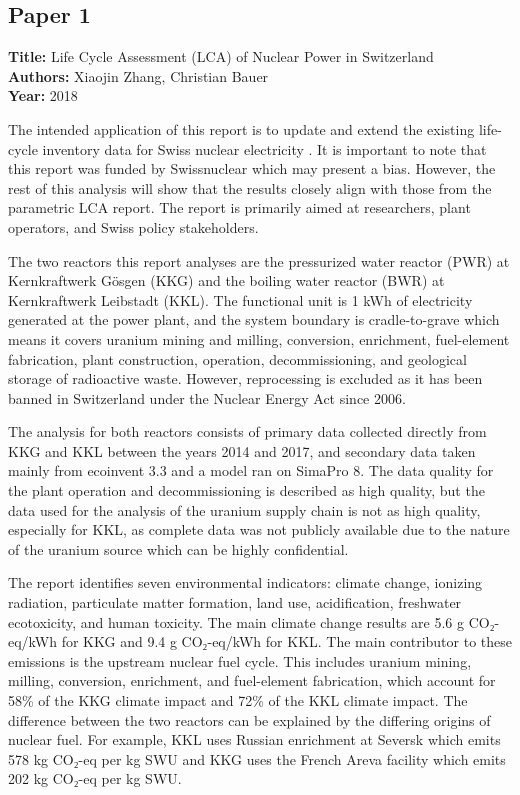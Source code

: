 \documentclass[9pt]{extarticle}
\begin{document}
\subsection{Paper 1 \parencite{zhang}}
\textbf{Title:} Life Cycle Assessment (LCA) of Nuclear Power in Switzerland\\
\textbf{Authors:} Xiaojin Zhang, Christian Bauer\\
\textbf{Year:} 2018

The intended application of this report is to update and extend the existing life-cycle
inventory data for Swiss nuclear electricity \parencite{zhang}. It is important to note
that this report was funded by Swissnuclear which may present a bias. However, the rest
of this analysis will show that the results closely align with those from the parametric
LCA report. The report is primarily aimed at researchers, plant operators, and Swiss
policy stakeholders.

The two reactors this report analyses are the pressurized water reactor (PWR) at
Kernkraftwerk Gösgen (KKG) and the boiling water reactor (BWR) at Kernkraftwerk
Leibstadt (KKL). The functional unit is 1 kWh of electricity generated at the power
plant, and the system boundary is cradle-to-grave which means it covers uranium mining
and milling, conversion, enrichment, fuel-element fabrication, plant construction,
operation, decommissioning, and geological storage of radioactive waste. However,
reprocessing is excluded as it has been banned in Switzerland under the Nuclear Energy
Act since 2006.

The analysis for both reactors consists of primary data collected directly from KKG and
KKL between the years 2014 and 2017, and secondary data taken mainly from ecoinvent 3.3
and a model ran on SimaPro 8. The data quality for the plant operation and
decommissioning is described as high quality, but the data used for the analysis of the
uranium supply chain is not as high quality, especially for KKL, as complete data was
not publicly available due to the nature of the uranium source which can be highly
confidential.

The report identifies seven environmental indicators: climate change, ionizing radiation,
particulate matter formation, land use, acidification, freshwater ecotoxicity, and human
toxicity. The main climate change results are 5.6 g CO₂-eq/kWh for KKG and 9.4 g CO₂-eq/kWh
for KKL. The main contributor to these emissions is the upstream nuclear fuel cycle.
This includes uranium mining, milling, conversion, enrichment, and fuel-element
fabrication, which account for 58\% of the KKG climate impact and 72\% of the KKL
climate impact. The difference between the two reactors can be explained by the
differing origins of nuclear fuel. For example, KKL uses Russian enrichment at Seversk
which emits 578 kg CO₂-eq per kg SWU and KKG uses the French Areva facility which emits
202 kg CO₂-eq per kg SWU.
\end{document}
